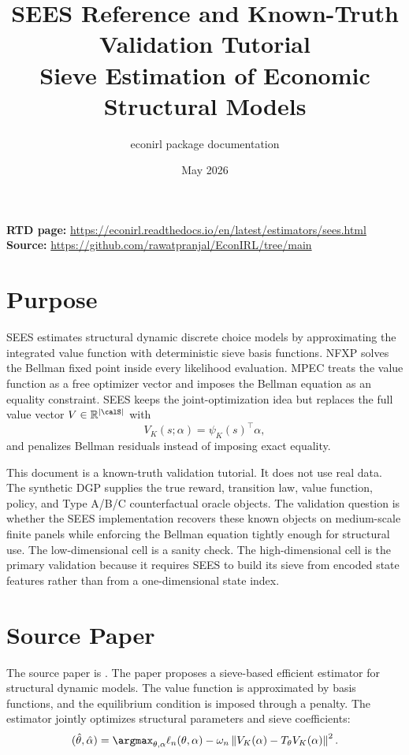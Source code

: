 \documentclass[10pt]{article}
\title{SEES Reference and Known-Truth Validation Tutorial\\[3pt]
\large Sieve Estimation of Economic Structural Models}
\author{econirl package documentation}
\date{May 2026}
\begin{document}
\maketitle

\begin{center}
\small
\textbf{RTD page:}
\url{https://econirl.readthedocs.io/en/latest/estimators/sees.html}
\quad
\textbf{Source:}
\url{https://github.com/rawatpranjal/EconIRL/tree/main}
\end{center}

\section{Purpose}

SEES estimates structural dynamic discrete choice models by approximating the
integrated value function with deterministic sieve basis functions. NFXP solves
the Bellman fixed point inside every likelihood evaluation. MPEC treats the
value function as a free optimizer vector and imposes the Bellman equation as
an equality constraint. SEES keeps the joint-optimization idea but replaces the
full value vector \(V\in\mathbb R^{|\calS|}\) with
\[
V_K(s;\alpha) = \psi_K(s)^\top \alpha,
\]
and penalizes Bellman residuals instead of imposing exact equality.

This document is a known-truth validation tutorial. It does not use real data.
The synthetic DGP supplies the true reward, transition law, value function,
policy, and Type A/B/C counterfactual oracle objects. The validation question
is whether the SEES implementation recovers these known objects on
medium-scale finite panels while enforcing the Bellman equation tightly enough
for structural use. The low-dimensional cell is a sanity check. The
high-dimensional cell is the primary validation because it requires SEES to
build its sieve from encoded state features rather than from a one-dimensional
state index.

\section{Source Paper}

The source paper is \citet{luoSang2024}. The paper proposes a sieve-based
efficient estimator for structural dynamic models. The value function is
approximated by basis functions, and the equilibrium condition is imposed
through a penalty. The estimator jointly optimizes structural parameters and
sieve coefficients:
\[
(\hat\theta,\hat\alpha)
=
\argmax_{\theta,\alpha}
\ell_n(\theta,\alpha)
-
\omega_n
\left\|V_K(\alpha)-T_\theta V_K(\alpha)\right\|^2.
\]
\end{document}
